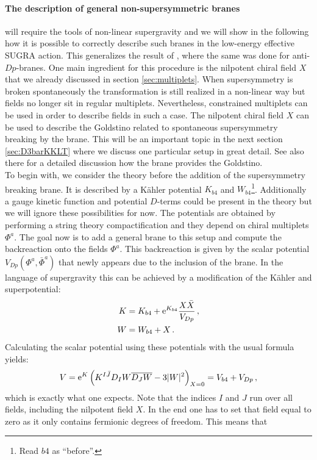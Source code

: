 \documentclass[12pt]{report}
\newcommand{\be}{\begin{equation}}
\newcommand{\ee}{\end{equation}}
\newcommand{\bea}{\begin{equation}\begin{aligned}}
\newcommand{\eea}{\end{aligned}\end{equation}}
\def\rme{{\rm e}}
\begin{document}
\paragraph{The description of general non-supersymmetric branes} will require the tools of non-linear supergravity and we will show in the following how it is possible to correctly describe such branes in the low-energy effective SUGRA action. This generalizes the result of \cite{Kallosh:2018nrk}, where the same was done for anti-$Dp$-branes. One main ingredient for this procedure is the nilpotent chiral field $X$ that we already discussed in section \ref{sec:multiplets}. When supersymmetry is broken spontaneously the transformation is still realized in a non-linear way but fields no longer sit in regular multiplets. Nevertheless, constrained multiplets can be used in order to describe fields in such a case. The nilpotent chiral field $X$ can be used to describe the Goldstino related to spontaneous supersymmetry breaking by the brane. This will be an important topic in the next section \ref{sec:D3barKKLT} where we discuss one particular setup in great detail. See also there for a detailed discussion how the brane provides the Goldstino.\\
To begin with, we consider the theory before the addition of the supersymmetry breaking brane. It is described by a Kähler potential $K_{b4}$ and $W_{b4}$\footnote{Read $b4$ as ``before''.}. Additionally a gauge kinetic function and potential $D$-terms could be present in the theory but we will ignore these possibilities for now. The potentials are obtained by performing a string theory compactification and they depend on chiral multiplets $\Phi^a$. The goal now is to add a general brane to this setup and compute the backreaction onto the fields $\Phi^a$. This backreaction is given by the scalar potential $V_{Dp}(\Phi^a,\bar{\Phi}^a)$ that newly appears due to the inclusion of the brane. In the language of supergravity this can be achieved by a modification of the Kähler and superpotential:
\bea
K &= K_{b4} + \rme^{K_{b4}} \frac{X\bar{X}}{V_{Dp}}\,,\\
W &= W_{b4} + X\,.
\label{eq:newsugra}
\eea
Calculating the scalar potential using these potentials with the usual formula yields:
\be 
V = \rme^K \left(K^{I\bar{J}} D_I W \overline{D_J W} - 3 |W|^2 \right)_{X=0}  = V_{b4} + V_{Dp}\,,
\ee
which is exactly what one expects. Note that the indices $I$ and $J$ run over all fields, including the nilpotent field $X$. In the end one has to set that field equal to zero as it only contains fermionic degrees of freedom. This means that 
\end{document}
